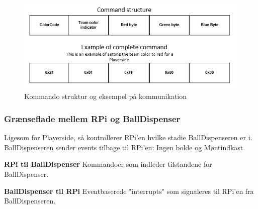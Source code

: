 \documentclass[Arkitektur/System_main.tex]{subfiles}
\begin{document}
\begin{figure}[H]
    \centering
    \includegraphics[width=\textwidth]{Arkitektur/Grenseflader/Graphics/teamColor.png}
    \caption{Kommando struktur og eksempel på kommunikation}
    \label{fig:teamColor}
\end{figure}

\subsubsection{Grænseflade mellem RPi og BallDispenser}
Ligesom for Playerside, så kontrollerer RPi'en hvilke stadie BallDispenseren er i. BallDispenseren sender events tilbage til RPi'en: Ingen bolde og Møntindkast. 

\textbf{RPi til BallDispenser}
Kommandoer som indleder tilstandene for BallDispenser. 

\begin{table}[H]
\end{table}

\textbf{BallDispenser til RPi}
Eventbaserede "interrupts" som signaleres til RPi'en fra BallDispenseren. 
\begin{table}[H]
\end{table}
\end{document}
